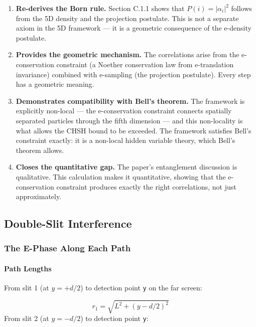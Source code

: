 \documentclass[aps,prd,preprint,superscriptaddress,longbibliography,floatfix]{revtex4-2}
\theoremstyle{remark}
\begin{document}
\begin{enumerate}
  \item \textbf{Re-derives the Born rule.} Section C.1.1 shows that $P(i) = |\alpha_{i}|^{2}$ follows from the 5D density and the projection postulate. This is not a separate axiom in the 5D framework --- it is a geometric consequence of the e-density postulate.
  \item \textbf{Provides the geometric mechanism.} The correlations arise from the e-conservation constraint (a Noether conservation law from e-translation invariance) combined with e-sampling (the projection postulate). Every step has a geometric meaning.
  \item \textbf{Demonstrates compatibility with Bell's theorem.} The framework is explicitly non-local --- the e-conservation constraint connects spatially separated particles through the fifth dimension --- and this non-locality is what allows the CHSH bound to be exceeded. The framework satisfies Bell's constraint exactly: it is a non-local hidden variable theory, which Bell's theorem allows.
  \item \textbf{Closes the quantitative gap.} The paper's entanglement discussion is qualitative. This calculation makes it quantitative, showing that the e-conservation constraint produces exactly the right correlations, not just approximately.
\end{enumerate}



\subsection{Double-Slit Interference}


\subsubsection{The E-Phase Along Each Path}


\paragraph{Path Lengths}

From slit 1 (at $y = +d/2$) to detection point \texttt{y} on the far screen:


\begin{equation}
    r_{1} = \sqrt{L^{2} + (y - d/2)^{2}}
\end{equation}
From slit 2 (at $y = -d/2$) to detection point \texttt{y}:
\end{document}
